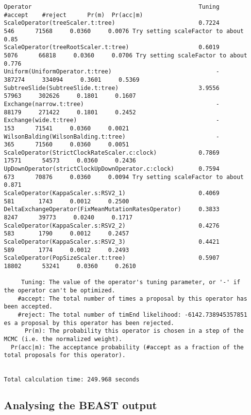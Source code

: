 \documentclass[12pt]{article}
\begin{document}
{\begin{verbatim}
Operator                                                Tuning    #accept    #reject      Pr(m)  Pr(acc|m)
ScaleOperator(treeScaler.t:tree)                        0.7224        546      71568     0.0360     0.0076 Try setting scaleFactor to about 0.85
ScaleOperator(treeRootScaler.t:tree)                    0.6019       5076      66818     0.0360     0.0706 Try setting scaleFactor to about 0.776
Uniform(UniformOperator.t:tree)                              -     387274     334094     0.3601     0.5369 
SubtreeSlide(SubtreeSlide.t:tree)                       3.9556      57963     302626     0.1801     0.1607 
Exchange(narrow.t:tree)                                      -      88179     271422     0.1801     0.2452 
Exchange(wide.t:tree)                                        -        153      71541     0.0360     0.0021 
WilsonBalding(WilsonBalding.t:tree)                          -        365      71560     0.0360     0.0051 
ScaleOperator(StrictClockRateScaler.c:clock)            0.7869      17571      54573     0.0360     0.2436 
UpDownOperator(strictClockUpDownOperator.c:clock)       0.7594        673      70876     0.0360     0.0094 Try setting scaleFactor to about 0.871
ScaleOperator(KappaScaler.s:RSV2_1)                     0.4069        581       1743     0.0012     0.2500 
DeltaExchangeOperator(FixMeanMutationRatesOperator)     0.3833       8247      39773     0.0240     0.1717 
ScaleOperator(KappaScaler.s:RSV2_2)                     0.4276        583       1790     0.0012     0.2457 
ScaleOperator(KappaScaler.s:RSV2_3)                     0.4421        589       1774     0.0012     0.2493 
ScaleOperator(PopSizeScaler.t:tree)                     0.5907      18802      53241     0.0360     0.2610 

     Tuning: The value of the operator's tuning parameter, or '-' if the operator can't be optimized.
    #accept: The total number of times a proposal by this operator has been accepted.
    #reject: The total number of timEnd likelihood: -6142.738945357851
es a proposal by this operator has been rejected.
      Pr(m): The probability this operator is chosen in a step of the MCMC (i.e. the normalized weight).
  Pr(acc|m): The acceptance probability (#accept as a fraction of the total proposals for this operator).


Total calculation time: 249.968 seconds
\end{verbatim}}


\subsection*{Analysing the BEAST output}
\end{document}
